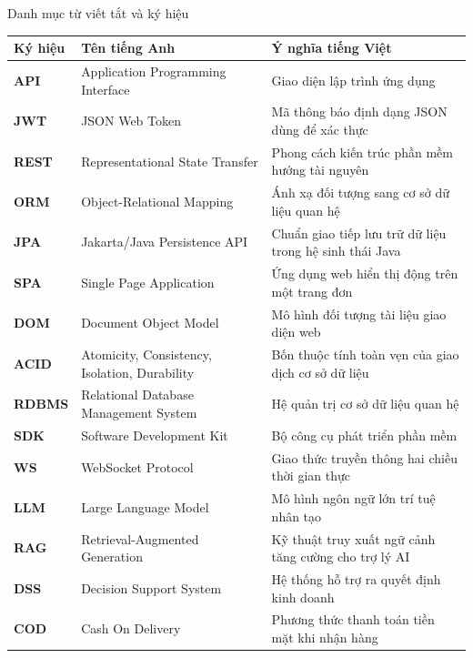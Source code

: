 \documentclass{uetgraduation}
\begin{document}
\begin{contentlisting}
\tableofcontents
\listoffigures
\listoftables

\begin{contentlistingsection}{Danh mục từ viết tắt và ký hiệu}
\begin{longtable}{p{}p{}p{}}
\hline
\textbf{Ký hiệu} & \textbf{Tên tiếng Anh} & \textbf{Ý nghĩa tiếng Việt} \\ \hline
\endhead
\textbf{API} & Application Programming Interface & Giao diện lập trình ứng dụng \\
\textbf{JWT} & JSON Web Token & Mã thông báo định dạng JSON dùng để xác thực \\
\textbf{REST} & Representational State Transfer & Phong cách kiến trúc phần mềm hướng tài nguyên \\
\textbf{ORM} & Object-Relational Mapping & Ánh xạ đối tượng sang cơ sở dữ liệu quan hệ \\
\textbf{JPA} & Jakarta/Java Persistence API & Chuẩn giao tiếp lưu trữ dữ liệu trong hệ sinh thái Java \\
\textbf{SPA} & Single Page Application & Ứng dụng web hiển thị động trên một trang đơn \\
\textbf{DOM} & Document Object Model & Mô hình đối tượng tài liệu giao diện web \\
\textbf{ACID} & Atomicity, Consistency, Isolation, Durability & Bốn thuộc tính toàn vẹn của giao dịch cơ sở dữ liệu \\
\textbf{RDBMS} & Relational Database Management System & Hệ quản trị cơ sở dữ liệu quan hệ \\
\textbf{SDK} & Software Development Kit & Bộ công cụ phát triển phần mềm \\
\textbf{WS} & WebSocket Protocol & Giao thức truyền thông hai chiều thời gian thực \\
\textbf{LLM} & Large Language Model & Mô hình ngôn ngữ lớn trí tuệ nhân tạo \\
\textbf{RAG} & Retrieval-Augmented Generation & Kỹ thuật truy xuất ngữ cảnh tăng cường cho trợ lý AI \\
\textbf{DSS} & Decision Support System & Hệ thống hỗ trợ ra quyết định kinh doanh \\
\textbf{COD} & Cash On Delivery & Phương thức thanh toán tiền mặt khi nhận hàng \\

\end{longtable}
\end{contentlistingsection}
\end{contentlisting}
\end{document}
